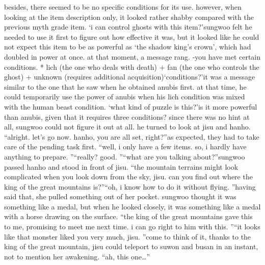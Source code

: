  besides, there seemed to be no specific conditions for its use.
 however, when looking at the item description only, it looked rather shabby compared with the previous myth grade item.
‘i can control ghosts with this item?’sungwoo felt he needed to use it first to figure out how effective it was, but it looked like he could not expect this item to be as powerful as ‘the shadow king’s crown’, which had doubled in power at once.
at that moment, a message rang.
-you have met certain conditions.
* lich (the one who deals with death) + fan (the one who controls the ghost) + unknown (requires additional acquisition)‘conditions?’it was a message similar to the one that he saw when he obtained anubis first.
 at that time, he could temporarily use the power of anubis when his lich condition was mixed with the human beast condition.
‘what kind of puzzle is this?’is it more powerful than anubis, given that it requires three conditions? since there was no hint at all, sungwoo could not figure it out at all.
he turned to look at jisu and hanho.
“alright.
 let’s go now.
 hanho, you are all set, right?”as expected, they had to take care of the pending task first.
“well, i only have a few items.
 so, i hardly have anything to prepare.
”“really? good.
”“what are you talking about?”sungwoo passed hanho and stood in front of jisu.
“the mountain terrains might look complicated when you look down from the sky, jisu.
 can you find out where the king of the great mountains is?”“oh, i know how to do it without flying.
”having said that, she pulled something out of her pocket.
 sungwoo thought it was something like a medal, but when he looked closely, it was something like a medal with a horse drawing on the surface.
“the king of the great mountains gave this to me, promising to meet me next time.
 i can go right to him with this.
”“it looks like that monster liked you very much, jisu.
”come to think of it, thanks to the king of the great mountain, jisu could teleport to suwon and busan in an instant, not to mention her awakening.
“ah, this one…”

